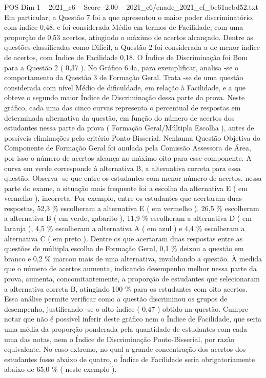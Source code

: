 \begin{textsample}{POS Dim 1 – 2021\_c6 – Score -2.00 – 2021\_c6/enade\_2021\_ef\_be61acbd52.txt}
Em particular, a Questão 7 foi a que apresentou o maior poder discriminatório, com índice 0,48, e foi considerada Médio em termos de Facilidade, com uma proporção de 0,53 acertos, atingindo o máximo de acertos alcançado.
Dentre as questões classificadas como Difícil, a Questão 2 foi considerada a de menor índice de acertos, com Índice de Facilidade 0,18.
O Índice de Discriminação foi Bom para a Questão 2 ( 0,37 ).
No Gráfico 6.4a, para exemplificar, analisa -se o comportamento da Questão 3 de Formação Geral.
Trata -se de uma questão considerada com nível Médio de dificuldade, em relação à Facilidade, e a que obteve o segundo maior Índice de Discriminação dessa parte da prova.
Neste gráfico, cada uma das cinco curvas representa o percentual de respostas em determinada alternativa da questão, em função do número de acertos dos estudantes nessa parte da prova ( Formação Geral/Múltipla Escolha ), antes de possíveis eliminações pelo critério Ponto-Bisserial.
Nenhuma Questão Objetiva do Componente de Formação Geral foi anulada pela Comissão Assessora de Área, por isso o número de acertos alcança no máximo oito para esse componente.
A curva em verde corresponde à alternativa B, a alternativa correta para essa questão.
Observa -se que entre os estudantes com menor número de acertos, nessa parte do exame, a situação mais frequente foi a escolha da alternativa E ( em vermelho ), incorreta.
Por exemplo, entre os estudantes que acertaram duas respostas, 52,3 \% escolheram a alternativa E ( em vermelho ), 26,5 \% escolheram a alternativa B ( em verde, gabarito ), 11,9 \% escolheram a alternativa D ( em laranja ), 4,5 \% escolheram a alternativa A ( em azul ) e 4,4 \% escolheram a alternativa C ( em preto ).
Dentre os que acertaram duas respostas entre as questões de múltipla escolha de Formação Geral, 0,1 \% deixou a questão em branco e 0,2 \% marcou mais de uma alternativa, invalidando a questão.
À medida que o número de acertos aumenta, indicando desempenho melhor nessa parte da prova, aumenta, concomitantemente, a proporção de estudantes que selecionaram a alternativa correta B, atingindo 100 \% para os estudantes com oito acertos.
Essa análise permite verificar como a questão discriminou os grupos de desempenho, justificando -se o alto índice ( 0,47 ) obtido na questão.
Cumpre notar que não é possível inferir deste gráfico nem o Índice de Facilidade, que seria uma média da proporção ponderada pela quantidade de estudantes com cada uma das notas, nem o Índice de Discriminação Ponto-Bisserial, por razão equivalente.
No caso extremo, no qual a grande concentração dos acertos dos estudantes fosse abaixo de quatro, o Índice de Facilidade seria obrigatoriamente abaixo de 65,0 \% ( neste exemplo ).

\end{textsample}
